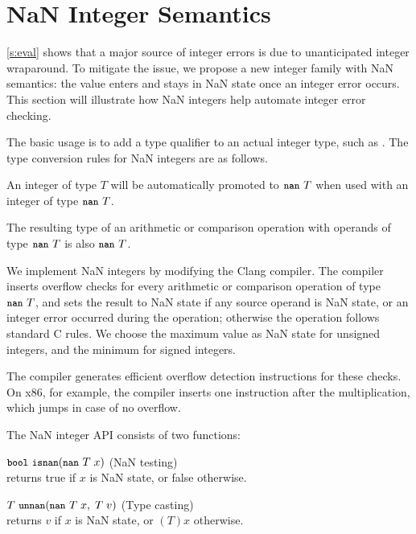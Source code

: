 \section{NaN Integer Semantics}
\label{s:miti}

\autoref{s:eval} shows that a major source of integer errors is due
to unanticipated integer wraparound.  To mitigate the issue, we
propose a new integer family with NaN semantics: the value enters
and stays in NaN state once an integer error occurs.
%
This section will illustrate how NaN integers help automate integer
error checking.

The basic usage is to add a type qualifier 
to an actual integer type, such as . The type conversion
rules for NaN integers are as follows.
\begin{CompactItemize}
\item
An integer of type $T$ will be automatically promoted to $\cc{nan}\ T$
when used with an integer of type $\cc{nan}\ T$.
\item
The resulting type of an arithmetic or comparison operation with
operands of type $\cc{nan}\ T$ is also $\cc{nan}\ T$.
\end{CompactItemize}

We implement NaN integers by modifying the Clang compiler.
The compiler inserts overflow checks for every arithmetic or
comparison operation of type $\cc{nan}\ T$, and sets the result to
NaN state if any source operand is NaN state, or an integer error occurred
during the operation; otherwise the operation follows standard C rules.
We choose the maximum value as NaN state for unsigned integers,
and the minimum for signed integers.

The compiler generates efficient overflow detection instructions
for these checks. On x86, for example,
the compiler inserts one  instruction after the 
multiplication, which jumps in case of no overflow.

The NaN integer API consists of two functions:
\begin{CompactItemize}
\item
$\cc{bool}\ \cc{isnan}(\cc{nan}\ T\; x)$ \hfill (NaN testing) \\
returns true if $x$ is NaN state, or false otherwise.
\item
$T\ \cc{unnan}(\cc{nan}\ T\; x,\; T\; v)$ \hfill (Type casting) \\
returns $v$ if $x$ is NaN state, or $(T)x$ otherwise.
\end{CompactItemize}

